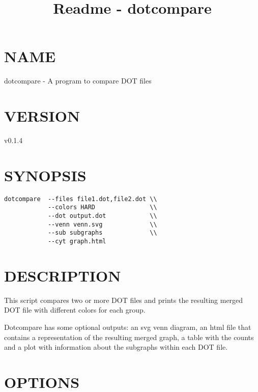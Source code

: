 \documentclass[10pt]{article}
\title{Readme - dotcompare}
\author{}
\date{}
\begin{document}
\maketitle

\section{NAME}\label{name}

dotcompare - A program to compare DOT files

\section{VERSION}\label{version}

v0.1.4

\section{SYNOPSIS}\label{synopsis}

\begin{verbatim}
dotcompare  --files file1.dot,file2.dot \\  
            --colors HARD               \\   
            --dot output.dot            \\               
            --venn venn.svg             \\ 
            --sub subgraphs             \\ 
            --cyt graph.html               
\end{verbatim}

\section{DESCRIPTION}\label{description}

This script compares two or more DOT files and prints the resulting
merged DOT file with different colors for each group.

Dotcompare has some optional outputs: an svg venn diagram, an html file
that contains a representation of the resulting merged graph, a table
with the counts and a plot with information about the subgraphs within
each DOT file.

\section{OPTIONS}\label{options}
\end{document}
